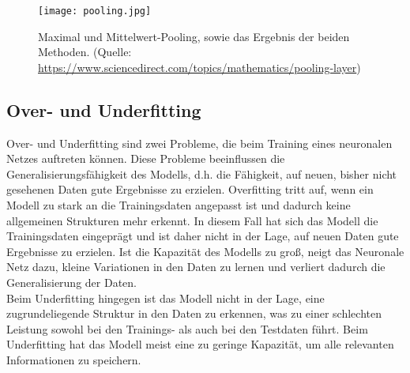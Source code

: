 \begin{figure}
	\centering
	\texttt{[image: pooling.jpg]}
	\caption{Maximal und Mittelwert-Pooling, sowie das Ergebnis der beiden Methoden. (Quelle: \url{https://www.sciencedirect.com/topics/mathematics/pooling-layer})}
	\label{fig:pooling}
\end{figure}


\subsection{Over- und Underfitting}
Over- und Underfitting sind zwei Probleme, die beim Training eines neuronalen Netzes auftreten können. Diese Probleme beeinflussen die Generalisierungsfähigkeit des Modells, d.h. die Fähigkeit, auf neuen, bisher nicht gesehenen Daten gute Ergebnisse zu erzielen.
Overfitting tritt auf, wenn ein Modell zu stark an die Trainingsdaten angepasst ist und dadurch keine allgemeinen Strukturen mehr erkennt. In diesem Fall hat sich das \gls{Modell} die Trainingsdaten eingeprägt und ist daher nicht in der Lage, auf neuen Daten gute Ergebnisse zu erzielen. Ist die Kapazität des \gls{Modell}s zu groß, neigt das Neuronale Netz dazu, kleine Variationen in den Daten zu lernen und verliert dadurch die Generalisierung der Daten.\\
Beim Underfitting hingegen ist das \gls{Modell} nicht in der Lage, eine zugrundeliegende Struktur in den Daten zu erkennen, was zu einer schlechten Leistung sowohl bei den Trainings- als auch bei den Testdaten führt. Beim Underfitting hat das \gls{Modell} meist eine zu geringe Kapazität, um alle relevanten Informationen zu speichern.\cite[vgl.][]{Goodfellow2016}